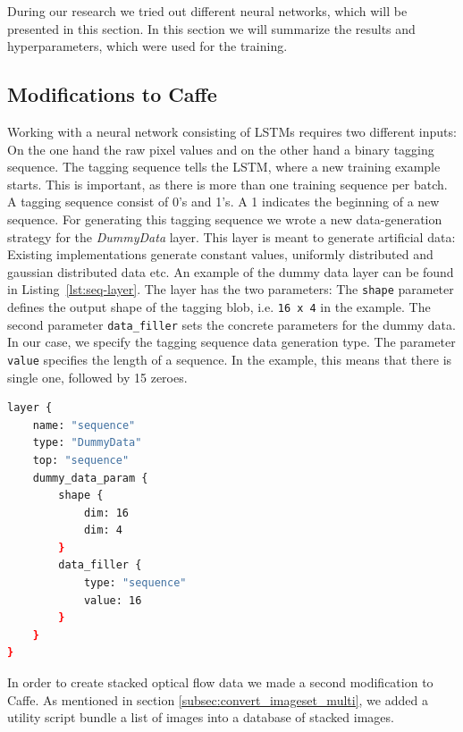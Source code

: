 During our research we tried out different neural networks, which will be presented in this section.
In this section we will summarize the results and hyperparameters, which were used for the training.

\subsection{Modifications to Caffe}

Working with a neural network consisting of LSTMs requires two different inputs:
On the one hand the raw pixel values and on the other hand a binary tagging sequence.
The tagging sequence tells the LSTM, where a new training example starts.
This is important, as there is more than one training sequence per batch.
A tagging sequence consist of 0's and 1's.
A 1 indicates the beginning of a new sequence.
For generating this tagging sequence we wrote a new data-generation strategy for the \emph{DummyData} layer.
This layer is meant to generate artificial data: Existing implementations generate constant values, uniformly distributed and gaussian distributed data etc.
\newline
An example of the dummy data layer can be found in Listing~\ref{lst:seq-layer}.
The layer has the two parameters:
The \texttt{shape} parameter defines the output shape of the tagging blob, i.e. \texttt{16 x 4} in the example.
The second parameter \texttt{data\_filler} sets the concrete parameters for the dummy data.
In our case, we specify the tagging sequence data generation type.
The parameter \texttt{value} specifies the length of a sequence.
In the example, this means that there is single one, followed by 15 zeroes.

\begin{lstlisting}[language=sh, caption=Sequence Layer, label=lst:seq-layer]
layer {
	name: "sequence"
	type: "DummyData"
	top: "sequence"
	dummy_data_param {
		shape {
			dim: 16
			dim: 4
		}
		data_filler {
			type: "sequence"
			value: 16
		}
	}
}
\end{lstlisting}


In order to create stacked optical flow data we made a second modification to Caffe. As mentioned in section \ref{subsec:convert_imageset_multi}, we added a utility script bundle a list of images into a database of stacked images.


